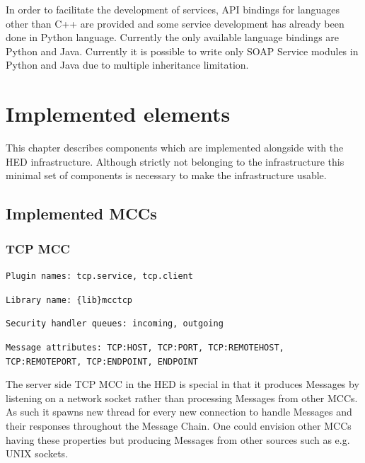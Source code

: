 \documentclass{book}
\begin{document}
In order to facilitate the development of services, API bindings for languages other than C++ are provided and some service development has already been done in Python language. Currently the only available language bindings are Python and Java. Currently it is possible to write only SOAP Service modules in Python and Java due to multiple inheritance limitation.



\chapter{Implemented elements}

This chapter describes components which are implemented alongside with the HED infrastructure. Although strictly not belonging to the infrastructure this minimal set of components is necessary to make the infrastructure usable.


\section{Implemented MCCs}


\subsection{TCP MCC}

\texttt{Plugin names: tcp.service, tcp.client}

\texttt{Library name: \{lib\}mcctcp}

\texttt{Security handler queues: incoming, outgoing}

\texttt{Message attributes: TCP:HOST, TCP:PORT, TCP:REMOTEHOST, TCP:REMOTEPORT, TCP:ENDPOINT, ENDPOINT}


The server side TCP MCC in the HED is special in that it produces Messages by listening on a network socket rather than processing Messages from other MCCs. As such it spawns new thread for every new connection to handle Messages and their responses throughout the Message Chain. One could envision other MCCs having these properties but producing Messages from other sources such as e.g. UNIX sockets.

\end{document}
